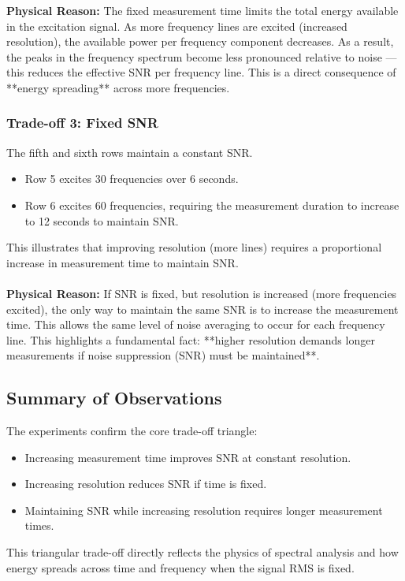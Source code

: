 \documentclass[a4paper,12pt]{article}
\begin{document}
\textbf{Physical Reason:} 
The fixed measurement time limits the total energy available in the excitation signal. As more frequency lines are excited (increased resolution), the available power per frequency component decreases. As a result, the peaks in the frequency spectrum become less pronounced relative to noise — this reduces the effective SNR per frequency line. This is a direct consequence of **energy spreading** across more frequencies.

\subsubsection*{Trade-off 3: Fixed SNR}
The fifth and sixth rows maintain a constant SNR.
\begin{itemize}
    \item Row 5 excites 30 frequencies over 6 seconds.
    \item Row 6 excites 60 frequencies, requiring the measurement duration to increase to 12 seconds to maintain SNR.
\end{itemize}
This illustrates that improving resolution (more lines) requires a proportional increase in measurement time to maintain SNR.
\\
\\
\textbf{Physical Reason:} 
If SNR is fixed, but resolution is increased (more frequencies excited), the only way to maintain the same SNR is to increase the measurement time. This allows the same level of noise averaging to occur for each frequency line. This highlights a fundamental fact: **higher resolution demands longer measurements if noise suppression (SNR) must be maintained**.


\subsection*{Summary of Observations}
The experiments confirm the core trade-off triangle:
\begin{itemize}
    \item Increasing measurement time improves SNR at constant resolution.
    \item Increasing resolution reduces SNR if time is fixed.
    \item Maintaining SNR while increasing resolution requires longer measurement times.
\end{itemize}
This triangular trade-off directly reflects the physics of spectral analysis and how energy spreads across time and frequency when the signal RMS is fixed.
\end{document}
